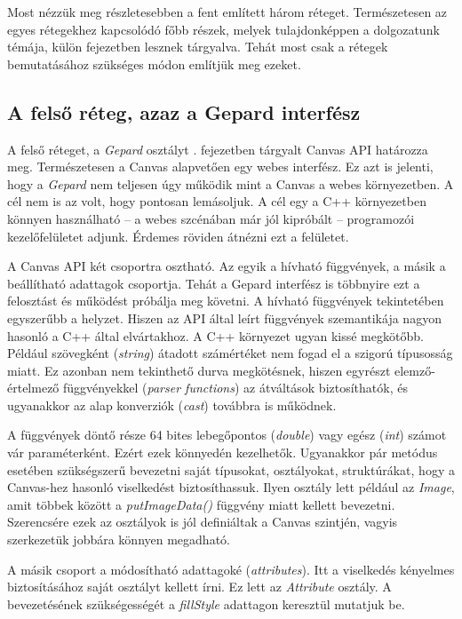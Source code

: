 \documentclass[12pt]{report}
\theoremstyle{definition}
\newcommand{\inenglish}[1]{\textsl{#1}}
\newcommand{\func}[1]{{\textsl{#1}}}
\begin{document}
Most nézzük meg részletesebben a fent említett három réteget. Természetesen az
egyes rétegekhez kapcsolódó főbb részek, melyek tulajdonképpen a dolgozatunk
témája, külön fejezetben lesznek tárgyalva. Tehát most csak a rétegek
bemutatásához szükséges módon említjük meg ezeket.

    \subsection*{A felső réteg, azaz a Gepard interfész}

A felső réteget, a \func{Gepard} osztályt . fejezetben
tárgyalt Canvas API határozza meg. Természetesen  a Canvas alapvetően egy webes
interfész. Ez azt is jelenti, hogy a \func{Gepard} nem teljesen úgy működik
mint a Canvas a webes környezetben. A cél nem is az volt, hogy pontosan
lemásoljuk. A cél egy a C++ környezetben könnyen használható -- a webes
szcénában már jól kipróbált -- programozói kezelőfelületet adjunk. Érdemes
röviden átnézni ezt a felületet.

A Canvas API két csoportra osztható. Az egyik a hívható függvények, a másik a
beállítható adattagok csoportja. Tehát a Gepard interfész is többnyire ezt a
felosztást és működést próbálja meg követni. A hívható függvények tekintetében
egyszerűbb a helyzet. Hiszen az API által leírt függvények szemantikája nagyon
hasonló a C++ által elvártakhoz. A C++ környezet ugyan kissé megkötőbb. Például
szövegként (\inenglish{string}) átadott számértéket nem fogad el a szigorú
típusosság miatt. Ez azonban nem tekinthető durva megkötésnek, hiszen egyrészt
elemző-értelmező függvényekkel (\inenglish{parser functions}) az átváltások
biztosíthatók, és ugyanakkor az alap konverziók (\inenglish{cast}) továbbra is
működnek.

A függvények döntő része 64 bites lebegőpontos (\func{double}) vagy egész
(\func{int}) számot vár paraméterként. Ezért ezek könnyedén kezelhetők.
Ugyanakkor pár metódus esetében szükségszerű bevezetni saját típusokat,
osztályokat, struktúrákat, hogy a Canvas-hez hasonló viselkedést
biztosíthassuk. Ilyen osztály lett például az \func{Image}, amit többek között
a \func{putImageData()} függvény miatt kellett bevezetni. Szerencsére ezek az
osztályok is jól definiáltak a Canvas szintjén, vagyis szerkezetük jobbára
könnyen megadható.

A másik csoport a módosítható adattagoké (\inenglish{attributes}). Itt a
viselkedés kényelmes biztosításához saját osztályt kellett írni. Ez lett az
\func{Attribute} osztály. A bevezetésének szükségességét a \func{fillStyle}
adattagon keresztül mutatjuk be.
\end{document}
